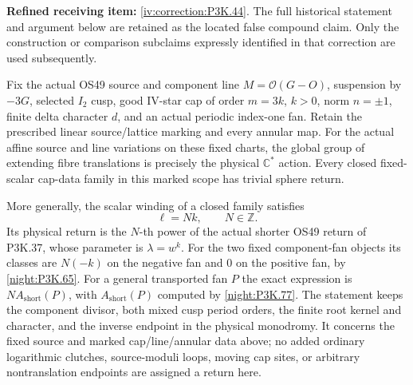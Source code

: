 \begin{theorem}\hypertarget{tag-02UP}{}\label{night:P3K.44}

\par\noindent\textbf{Refined receiving item:} \cref{iv:correction:P3K.44}. The full historical statement and argument below are retained as the located false compound claim. Only the construction or comparison subclaims expressly identified in that correction are used subsequently.

Fix the actual OS49 source and component line
\(M=\mathcal O(G-O)\), suspension by \(-3G\), selected
\(I_2\) cusp, good IV-star cap of order \(m=3k\), \(k>0\),
norm \(n=\pm1\), finite delta character \(d\), and an actual
periodic index-one fan. Retain the prescribed linear source/lattice
marking and every annular map. For the actual affine source and line
variations on these fixed charts, the global group of extending fibre
translations is precisely the physical \(\mathbb C^*\) action.
Every closed fixed-scalar cap-data family in this marked scope has
trivial sphere return.

More generally, the scalar winding of a closed family satisfies
\[
                          \ell=Nk,\qquad N\in\mathbb Z.
\]
Its physical return is the \(N\)-th power of the actual shorter
OS49 return of P3K.37, whose parameter is \(\lambda=w^k\).
For the two fixed component-fan objects its classes are
\(N(-k)\) on the negative fan and \(0\) on the positive fan,
by \cref{night:P3K.65}. For a general transported fan \(P\)
the exact expression is \(N A_{\mathrm{short}}(P)\), with
\(A_{\mathrm{short}}(P)\) computed by \cref{night:P3K.77}.
The statement keeps the component divisor, both mixed cusp period
orders, the finite root kernel and character, and the inverse endpoint
in the physical monodromy. It concerns the fixed source and marked
cap/line/annular data above; no added ordinary logarithmic clutches,
source-moduli loops, moving cap sites, or arbitrary nontranslation
endpoints are assigned a return here.


\end{theorem}

